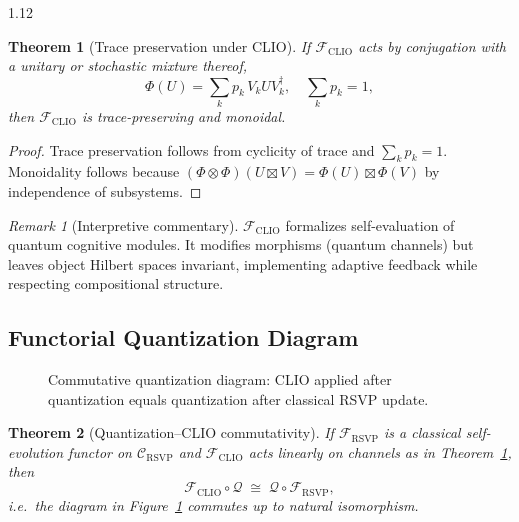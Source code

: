 \documentclass[12pt,a4paper]{article}
\numberwithin{equation}{section}
\newtheorem{theorem}{Theorem}[section]
\theoremstyle{remark}
\newtheorem{remark}{Remark}[section]
\theoremstyle{definition}
\begin{document}
\begin{spacing}{1.12}
\begin{theorem}[Trace preservation under CLIO]\label{thm:F-trace}
If $\mathcal{F}_{\mathrm{CLIO}}$ acts by conjugation with a unitary or stochastic mixture thereof,
\[
\Phi(U)=\sum_k p_k\, V_k U V_k^\dagger,\quad \sum_k p_k=1,
\]
then $\mathcal{F}_{\mathrm{CLIO}}$ is trace-preserving and monoidal.
\end{theorem}

\begin{proof}
Trace preservation follows from cyclicity of trace and $\sum_k p_k=1$. Monoidality follows because $(\Phi\otimes\Phi)(U\boxtimes V)=\Phi(U)\boxtimes\Phi(V)$ by independence of subsystems.
\end{proof}

\begin{remark}[Interpretive commentary]
$\mathcal{F}_{\mathrm{CLIO}}$ formalizes self-evaluation of quantum cognitive modules. It modifies morphisms (quantum channels) but leaves object Hilbert spaces invariant, implementing adaptive feedback while respecting compositional structure.
\end{remark}

\subsection{Functorial Quantization Diagram}\label{sec:F-diagram}

\begin{figure}[h]
\centering
{}
\caption{Commutative quantization diagram: CLIO applied after quantization equals quantization after classical RSVP update.}
\label{fig:F-diagram}
\end{figure}

\begin{theorem}[Quantization--CLIO commutativity]\label{thm:F-commute}
If $\mathcal{F}_{\mathrm{RSVP}}$ is a classical self-evolution functor on $\mathcal{C}_{\mathrm{RSVP}}$ and $\mathcal{F}_{\mathrm{CLIO}}$ acts linearly on channels as in Theorem~\ref{thm:F-trace}, then
\[
\mathcal{F}_{\mathrm{CLIO}}\circ \mathcal{Q}\;\cong\;\mathcal{Q}\circ \mathcal{F}_{\mathrm{RSVP}},
\]
i.e.\ the diagram in Figure~\ref{fig:F-diagram} commutes up to natural isomorphism.
\end{theorem}


\end{spacing}
\end{document}

